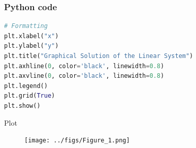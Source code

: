 \documentclass{beamer}
\begin{document}
\begin{frame}[fragile]
    \frametitle{Python code}
    \begin{lstlisting}[language=Python]
# Formatting
plt.xlabel("x")
plt.ylabel("y")
plt.title("Graphical Solution of the Linear System")
plt.axhline(0, color='black', linewidth=0.8)
plt.axvline(0, color='black', linewidth=0.8)
plt.legend()
plt.grid(True)
plt.show()
    \end{lstlisting}  
\end{frame}


\begin{frame}{Plot}
    \begin{figure}[H]
    \centering
    \texttt{[image: ../figs/Figure\_1.png]}
    \label{fig:1}
\end{figure}
\end{frame}
\end{document}
